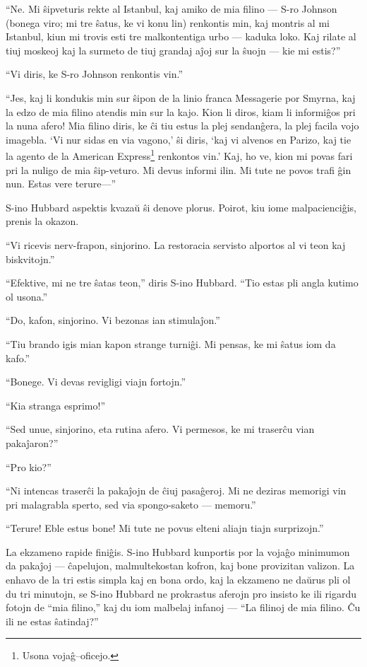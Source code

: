 ``Ne. Mi ŝipveturis rekte al Istanbul, kaj amiko de mia filino --- S-ro Johnson (bonega viro; mi tre ŝatus, ke vi konu lin) renkontis min, kaj montris al mi Istanbul, kiun mi trovis esti tre malkontentiga urbo --- kaduka loko. Kaj rilate al tiuj moskeoj kaj la surmeto de tiuj grandaj aĵoj sur la ŝuojn --- kie mi estis?''

``Vi diris, ke S-ro Johnson renkontis vin.''

``Jes, kaj li kondukis min sur ŝipon de la linio franca Messagerie por Smyrna, kaj la edzo de mia filino atendis min sur la kajo. Kion li diros, kiam li informiĝos pri la nuna afero! Mia filino diris, ke ĉi tiu estus la plej sendanĝera, la plej facila vojo imagebla. `Vi nur sidas en via vagono,' ŝi diris, `kaj vi alvenos en Parizo, kaj tie la agento de la American Express\footnote{Usona vojaĝ--oficejo.} renkontos vin.' Kaj, ho ve, kion mi povas fari pri la nuligo de mia ŝip-veturo. Mi devus informi ilin. Mi tute ne povos trafi ĝin nun. Estas vere terure---''

S-ino Hubbard aspektis kvazaŭ ŝi denove plorus. Poirot, kiu iome malpacienciĝis, prenis la okazon.

``Vi ricevis nerv-frapon, sinjorino. La restoracia servisto alportos al vi teon kaj biskvitojn.''

``Efektive, mi ne tre ŝatas teon,'' diris S-ino Hubbard. ``Tio estas pli angla kutimo ol usona.''

``Do, kafon, sinjorino. Vi bezonas ian stimulaĵon.''

``Tiu brando igis mian kapon strange turniĝi. Mi pensas, ke mi ŝatus iom da kafo.''

``Bonege. Vi devas revigligi viajn fortojn.''

``Kia stranga esprimo!''

``Sed unue, sinjorino, eta rutina afero. Vi permesos, ke mi traserĉu vian pakaĵaron?''

``Pro kio?''

``Ni intencas traserĉi la pakaĵojn de ĉiuj pasaĝeroj. Mi ne deziras memorigi vin pri malagrabla sperto, sed via spongo-saketo --- memoru.''

``Terure! Eble estus bone! Mi tute ne povus elteni aliajn tiajn surprizojn.''

La ekzameno rapide finiĝis. S-ino Hubbard kunportis por la vojaĝo minimumon da pakaĵoj --- ĉapelujon, malmultekostan kofron, kaj bone provizitan valizon. La enhavo de la tri estis simpla kaj en bona ordo, kaj la ekzameno ne daŭrus pli ol du tri minutojn, se S-ino Hubbard ne prokrastus aferojn pro insisto ke ili rigardu fotojn de ``mia filino,'' kaj du iom malbelaj infanoj --- ``La filinoj de mia filino. Ĉu ili ne estas ŝatindaj?''

